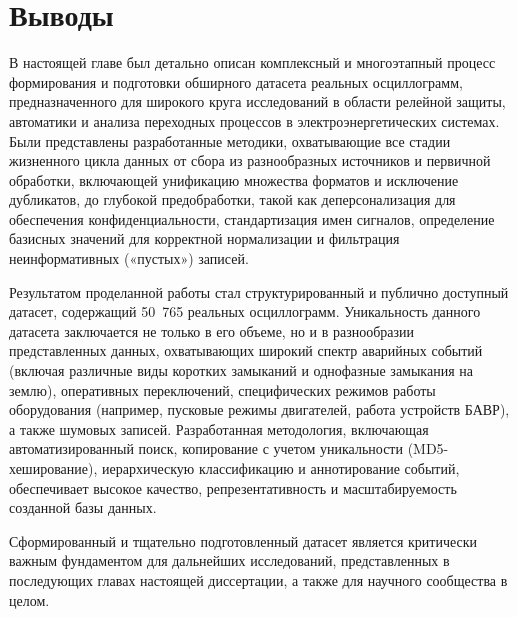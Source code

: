 
\section{Выводы}
\label{sec:ch03_conclusions}

В настоящей главе был детально описан комплексный и многоэтапный процесс формирования и подготовки обширного датасета реальных осциллограмм, предназначенного для широкого круга исследований в области релейной защиты, автоматики и анализа переходных процессов в электроэнергетических системах. Были представлены разработанные методики, охватывающие все стадии жизненного цикла данных от сбора из разнообразных источников и первичной обработки, включающей унификацию множества форматов и исключение дубликатов, до глубокой предобработки, такой как деперсонализация для обеспечения конфиденциальности, стандартизация имен сигналов, определение базисных значений для корректной нормализации и фильтрация неинформативных («пустых») записей.

Результатом проделанной работы стал структурированный и публично доступный датасет, содержащий 50~765 реальных осциллограмм. Уникальность данного датасета заключается не только в его объеме, но и в разнообразии представленных данных, охватывающих широкий спектр аварийных событий (включая различные виды коротких замыканий и однофазные замыкания на землю), оперативных переключений, специфических режимов работы оборудования (например, пусковые режимы двигателей, работа устройств БАВР), а также шумовых записей. Разработанная методология, включающая автоматизированный поиск, копирование с учетом уникальности (MD5-хеширование), иерархическую классификацию и аннотирование событий, обеспечивает высокое качество, репрезентативность и масштабируемость созданной базы данных.

Сформированный и тщательно подготовленный датасет является критически важным фундаментом для дальнейших исследований, представленных в последующих главах настоящей диссертации, а также для научного сообщества в целом.

